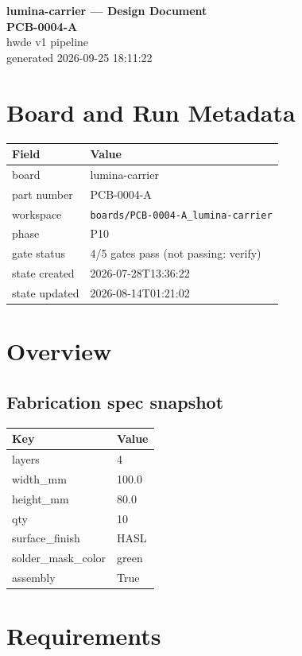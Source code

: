 \documentclass[11pt,a4paper]{article}
\begin{document}
\sloppy
\begin{center}
{\LARGE\bfseries lumina-carrier --- Design Document}\\[6pt]
{\Large\bfseries PCB-0004-A}\\[6pt]
{\large hwde v1 pipeline}\\[2pt]
generated 2026-09-25 18:11:22
\end{center}
\tableofcontents

\section{Board and Run Metadata}
{\small
\begin{longtable}{lp{11cm}}
\toprule
\textbf{Field} & \textbf{Value} \\
\midrule
\endhead
board & lumina-carrier \\
part number & PCB-0004-A \\
workspace & \texttt{boards/PCB-0004-A\_lumina-carrier} \\
phase & P10 \\
gate status & 4/5 gates pass (not passing: verify) \\
state created & 2026-07-28T13:36:22 \\
state updated & 2026-08-14T01:21:02 \\
\bottomrule
\end{longtable}
}
\section{Overview}
\subsection*{Fabrication spec snapshot}
{\small
\begin{longtable}{ll}
\toprule
\textbf{Key} & \textbf{Value} \\
\midrule
\endhead
layers & 4 \\
width\_mm & 100.0 \\
height\_mm & 80.0 \\
qty & 10 \\
surface\_finish & HASL \\
solder\_mask\_color & green \\
assembly & True \\
\bottomrule
\end{longtable}
}
\section{Requirements}
\end{document}
